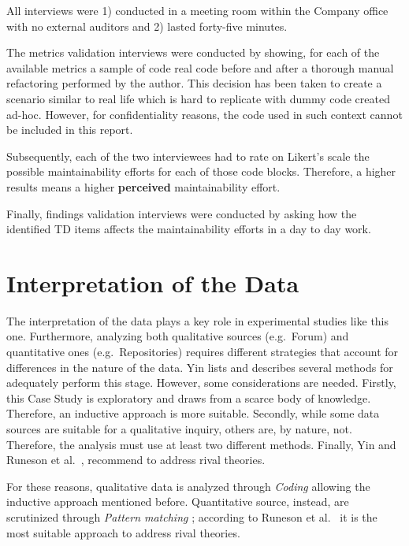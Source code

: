 All interviews were 1) conducted in a meeting room within the Company office with no external auditors and 2) lasted forty-five minutes.

The metrics validation interviews were conducted by showing, for each of the available metrics a sample of code real code before and after a thorough manual refactoring performed by the author. This decision has been taken to create a scenario similar to real life which is hard to replicate with dummy code created ad-hoc. However, for confidentiality reasons, the code used in such context cannot be included in this report.

Subsequently, each of the two interviewees had to rate on Likert's scale the possible maintainability efforts for each of those code blocks. Therefore, a higher results means a higher \textbf{perceived} maintainability effort.  

Finally, findings validation interviews were conducted by asking how the identified TD items affects the maintainability efforts in a day to day work.
%
%
%
%


%
%
%
%
\section{Interpretation of the Data} \label{data_interpretation}

The interpretation of the data plays a key role in experimental studies like this one. Furthermore, analyzing both qualitative sources (e.g.\ Forum) and quantitative ones (e.g.\ Repositories) requires different strategies that account for differences in the nature of the data. Yin \cite{case_study_guide} lists and describes several methods for adequately perform this stage. However, some considerations are needed. Firstly, this Case Study is exploratory and draws from a scarce body of knowledge. Therefore, an inductive approach is more suitable. Secondly, while some data sources are suitable for a qualitative inquiry, others are, by nature, not. Therefore, the analysis must use at least two different methods. Finally, Yin \cite{case_study_guide} and Runeson et al.\ \cite{case_study_software_engineering}, recommend to address rival theories.

For these reasons, qualitative data is analyzed through \textit{Coding} \cite{qualitative_inquiry} allowing the inductive approach mentioned before. Quantitative source, instead, are scrutinized through \textit{Pattern matching} \cite{case_study_guide}; according to Runeson et al.\ \cite{case_study_software_engineering} it is the most suitable approach to address rival theories.

